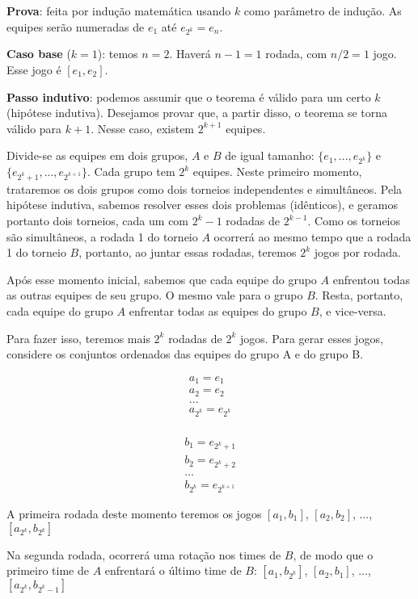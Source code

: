 \documentclass{article}
\begin{document}
\textbf{Prova}: feita por indução matemática usando $k$ como parâmetro de indução. As equipes serão numeradas de $e_1$ até $e_{2^k} = e_n$.

\textbf{Caso base} ($k = 1$): temos $n = 2$. Haverá $n-1 = 1$ rodada, com $n/2 = 1$ jogo. Esse jogo é $[e_1, e_2]$.

\textbf{Passo indutivo}: podemos assumir que o teorema é válido para um certo $k$ (hipótese indutiva). Desejamos provar que, a partir disso, o teorema se torna válido para $k+1$. Nesse caso, existem $2^{k+1}$ equipes. 

Divide-se as equipes em dois grupos, $A$ e $B$ de igual tamanho: $\{e_1, ..., e_{2^k}\}$ e $\{e_{2^k+1}, ..., e_{2^{k+1}}\}$. Cada grupo tem $2^k$ equipes. Neste primeiro momento, trataremos os dois grupos como dois torneios independentes e simultâneos. Pela hipótese indutiva, sabemos resolver esses dois problemas (idênticos), e geramos portanto dois torneios, cada um com $2^k - 1$ rodadas de $2^{k - 1}$. Como os torneios são simultâneos, a rodada 1 do torneio $A$ ocorrerá ao mesmo tempo que a rodada 1 do torneio $B$, portanto, ao juntar essas rodadas, teremos $2^k$ jogos por rodada. 

Após esse momento inicial, sabemos que cada equipe do grupo $A$ enfrentou todas as outras equipes de seu grupo. O mesmo vale para o grupo $B$. Resta, portanto, cada equipe do grupo $A$ enfrentar todas as equipes do grupo $B$, e vice-versa.

Para fazer isso, teremos mais $2^k$ rodadas de $2^k$ jogos. Para gerar esses jogos, considere os conjuntos ordenados das equipes do grupo A e do grupo B.

\begin{gather}
a_1 = e_1 \\
a_2 = e_2 \\
... \\
a_{2^k} = e_{2^k} \\
\end{gather}

\begin{gather}
b_1 = e_{2^k + 1} \\
b_2 = e_{2^k + 2} \\
... \\
b_{2^k} = e_{2^{k+1}}
\end{gather}

A primeira rodada deste momento teremos os jogos $[a_1, b_1]$, $[a_2, b_2]$, ..., $[a_{2^k}, b_{2^k}]$

Na segunda rodada, ocorrerá uma rotação nos times de $B$, de modo que o primeiro time de $A$ enfrentará o último time de $B$: $[a_1, b_{2^k}]$, $[a_2, b_1]$, ..., $[a_{2^k}, b_{2^k-1}]$
\end{document}
